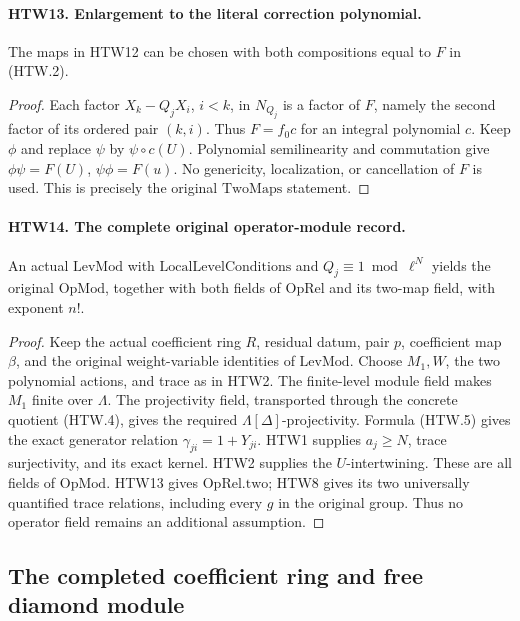 \paragraph{HTW13. Enlargement to the literal correction polynomial.}
\label{claim:HTW13}
The maps in HTW12 can be chosen with both compositions
equal to \(F\) in (HTW.2).
\begin{proof}
Each factor \(X_k-Q_jX_i\), \(i<k\), in
\(N_{Q_j}\) is a factor of \(F\), namely the second
factor of its ordered pair \((k,i)\).
Thus \(F=f_0c\) for an integral polynomial \(c\).
Keep \(\phi\) and replace \(\psi\) by
\(\psi\circ c(U)\).  Polynomial semilinearity and
commutation give
\(\phi\psi=F(U)\), \(\psi\phi=F(u)\).
No genericity, localization, or cancellation of \(F\)
is used.  This is precisely the original
\(\mathrm{TwoMaps}\) statement.
\end{proof}

\paragraph{HTW14. The complete original operator-module record.}
\label{claim:HTW14}
An actual \(\mathrm{LevMod}\) with
\(\mathrm{LocalLevelConditions}\) and
\(Q_j\equiv1\bmod\ell^N\) yields the original
\(\mathrm{OpMod}\), together with both fields of
\(\mathrm{OpRel}\) and its two-map field, with exponent \(n!\).
\begin{proof}
Keep the actual coefficient ring \(R\), residual datum,
pair \(p\), coefficient map \(\beta\), and the original
weight-variable identities of \(\mathrm{LevMod}\).
Choose \(M_1,W\), the two polynomial actions, and trace
as in HTW2.  The finite-level module field makes \(M_1\)
finite over \(\Lambda\).  The projectivity field,
transported through the concrete quotient (HTW.4),
gives the required \(\Lambda[\Delta]\)-projectivity.
Formula (HTW.5) gives the exact generator relation
\(\gamma_{ji}=1+Y_{ji}\).  HTW1 supplies \(a_j\ge N\),
trace surjectivity, and its exact kernel.
HTW2 supplies the \(U\)-intertwining.
These are all fields of \(\mathrm{OpMod}\).
HTW13 gives \(\mathrm{OpRel.two}\); HTW8 gives its
two universally quantified trace relations, including
every \(g\) in the original group.  Thus no operator
field remains an additional assumption.
\end{proof}

\subsection{The completed coefficient ring and free diamond module}


